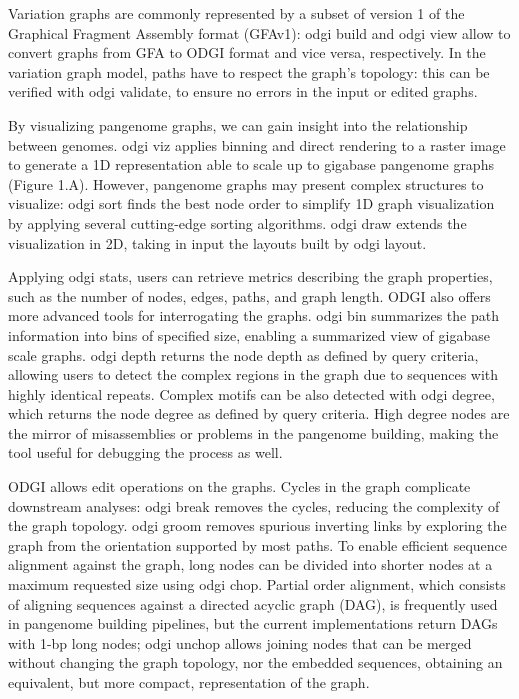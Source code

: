 \documentclass{bioinfo}
\begin{document}

Variation graphs are commonly represented by a subset of version 1 of the Graphical Fragment Assembly format (GFAv1): odgi build and odgi view allow to convert graphs from GFA to ODGI format and vice versa, respectively.
In the variation graph model, paths have to respect the graph’s topology: this can be verified with odgi validate, to ensure no errors in the input or edited graphs.

By visualizing pangenome graphs, we can gain insight into the relationship between genomes.
odgi viz applies binning and direct rendering to a raster image to generate a 1D representation able to scale up to gigabase pangenome graphs (Figure 1.A).
However, pangenome graphs may present complex structures to visualize: odgi sort finds the best node order to simplify 1D graph visualization by applying several cutting-edge sorting algorithms.
odgi draw extends the visualization in 2D, taking in input the layouts built by odgi layout.

Applying odgi stats, users can retrieve metrics describing the graph properties, such as the number of nodes, edges, paths, and graph length.
ODGI also offers more advanced tools for interrogating the graphs. odgi bin summarizes the path information into bins of specified size, enabling a summarized view of gigabase scale graphs.
odgi depth returns the node depth as defined by query criteria, allowing users to detect the complex regions in the graph due to sequences with highly identical repeats.
Complex motifs can be also detected with odgi degree, which returns the node degree as defined by query criteria.
High degree nodes are the mirror of misassemblies or problems in the pangenome building, making the tool useful for debugging the process as well.

ODGI allows edit operations on the graphs.
Cycles in the graph complicate downstream analyses: odgi break removes the cycles, reducing the complexity of the graph topology.
odgi groom removes spurious inverting links by exploring the graph from the orientation supported by most paths.
To enable efficient sequence alignment against the graph, long nodes can be divided into shorter nodes at a maximum requested size using odgi chop.
Partial order alignment, which consists of aligning sequences against a directed acyclic graph (DAG), is frequently used in pangenome building pipelines, but the current implementations return DAGs with 1-bp long nodes; odgi unchop allows joining nodes that can be merged without changing the graph topology, nor the embedded sequences, obtaining an equivalent, but more compact, representation of the graph.
\end{document}
